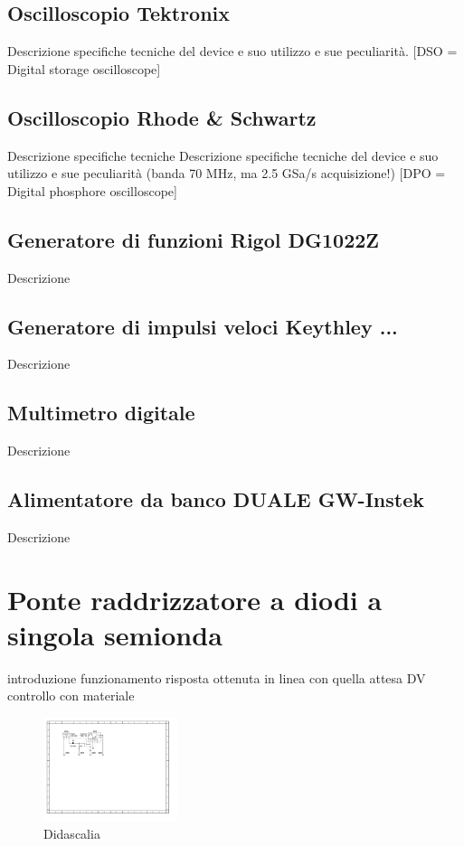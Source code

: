 \documentclass[journal]{IEEEtran}
\begin{document}
\subsection{\textbf{Oscilloscopio Tektronix}}
Descrizione specifiche tecniche del device e suo utilizzo e sue peculiarità. [DSO = Digital storage oscilloscope]

\subsection{\textbf{Oscilloscopio Rhode & Schwartz}}
Descrizione specifiche tecniche 
Descrizione specifiche tecniche del device e suo utilizzo e sue peculiarità (banda 70 MHz, ma 2.5 GSa/s acquisizione!)
[DPO = Digital phosphore oscilloscope]

\subsection{\textbf{Generatore di funzioni Rigol DG1022Z}}
Descrizione

\subsection{\textbf{Generatore di impulsi veloci Keythley ...}}
Descrizione

\subsection{\textbf{Multimetro digitale}}
Descrizione

\subsection{\textbf{Alimentatore da banco DUALE GW-Instek}}
Descrizione

\section{\textbf{Ponte raddrizzatore a diodi a singola semionda}} %
introduzione funzionamento 
risposta ottenuta in linea con quella attesa
DV controllo con materiale

\begin{figure}[H]%
\begin {center}
\includegraphics[width=0.35\textwidth]{sch-simulations/output/Diode-rectifier.pdf}
\caption{Didascalia}
\label{fig:oscilloscope}
\end {center}
\end{figure}
\end{document}
